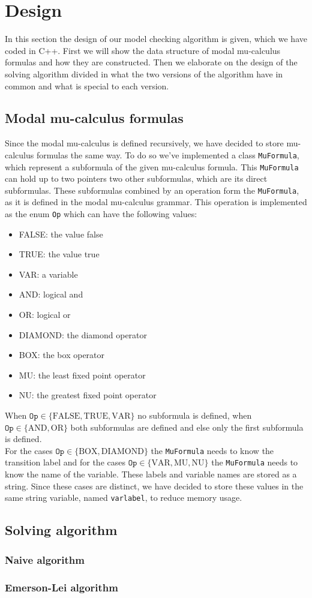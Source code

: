 \section{Design}
\label{design}
In this section the design of our model checking algorithm is given, which we have coded in C++. First we will show the data structure of modal mu-calculus formulas and how they are constructed. Then we elaborate on the design of the solving algorithm divided in what the two versions of the algorithm have in common and what is special to each version.

\subsection{Modal mu-calculus formulas}
Since the modal mu-calculus is defined recursively, we have decided to store mu-calculus formulas the same way. To do so we've implemented a class \texttt{MuFormula}, which represent a subformula of the given mu-calculus formula. This \texttt{MuFormula} can hold up to two pointers two other subformulas, which are its direct subformulas. These subformulas combined by an operation form the \texttt{MuFormula}, as it is defined in the modal mu-calculus grammar. This operation is implemented as the enum \texttt{Op} which can have the following values:
\begin{itemize}
\item FALSE: the value false
\item TRUE: the value true
\item VAR: a variable
\item AND: logical and
\item OR: logical or
\item DIAMOND: the diamond operator
\item BOX: the box operator
\item MU: the least fixed point operator
\item NU: the greatest fixed point operator
\end{itemize}
When $\texttt{Op} \in \{\text{FALSE}, \text{TRUE}, \text{VAR}\}$ no subformula is defined, when $\texttt{Op} \in \{\text{AND}, \text{OR}\}$ both subformulas are defined and else only the first subformula is defined.\\
For the cases $\texttt{Op} \in \{\text{BOX}, \text{DIAMOND}\}$ the \texttt{MuFormula} needs to know the transition label and for the cases $\texttt{Op} \in \{\text{VAR}, \text{MU}, \text{NU}\}$ the \texttt{MuFormula} needs to know the name of the variable. These labels and variable names are stored as a string. Since these cases are distinct, we have decided to store these values in the same string variable, named \texttt{varlabel}, to reduce memory usage.



\subsection{Solving algorithm}


\subsubsection{Naive algorithm}


\subsubsection{Emerson-Lei algorithm}
